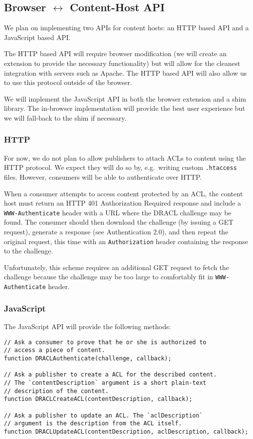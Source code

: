\documentclass[pdftex,12pt,a4papaer]{article}
\begin{document}
\subsection{Browser $\leftrightarrow$ Content-Host API}

We plan on implementing two APIs for content hosts: an HTTP based API and a
JavaScript based API.

The HTTP based API will require browser modification (we will create an
extension to provide the necessary functionality) but will allow for the
cleanest integration with servers such as Apache. The HTTP based API will also
allow us to use this protocol outside of the browser.

We will implement the JavaScript API in both the browser extension and a
shim library. The in-browser implementation will provide the best user
experience but we will fall-back to the shim if necessary.

\subsubsection{HTTP}

For now, we do not plan to allow publishers to attach ACLs to content using the
HTTP protocol. We expect they will do so by, e.g.\ writing custom
\texttt{.htaccess} files. However, consumers will be able to authenticate over
HTTP.

When a consumer attempts to access content protected by an ACL, the content host
must return an HTTP 401 Authorization Required response and include a
\texttt{WWW-Authenticate} header with a URL where the DRACL challenge may be
found. The consumer should then download the challenge (by issuing a GET
request), generate a response (see Authentication 2.0), and then repeat the
original request, this time with an \texttt{Authorization} header containing the
response to the challenge.

Unfortunately, this scheme requires an additional GET request to fetch the
challenge because the challenge may be too large to comfortably fit in
\texttt{WWW-Authenticate} header.

\subsubsection{JavaScript}

The JavaScript API will provide the following methods:

\begin{verbatim}
// Ask a consumer to prove that he or she is authorized to
// access a piece of content.
function DRACLAuthenticate(challenge, callback);

// Ask a publisher to create a ACL for the described content.
// The `contentDescription` argument is a short plain-text
// description of the content.
function DRACLCreateACL(contentDescription, callback);

// Ask a publisher to update an ACL. The `aclDescription`
// argument is the description from the ACL itself.
function DRACLUpdateACL(contentDescription, aclDescription, callback);
\end{verbatim}
\end{document}

